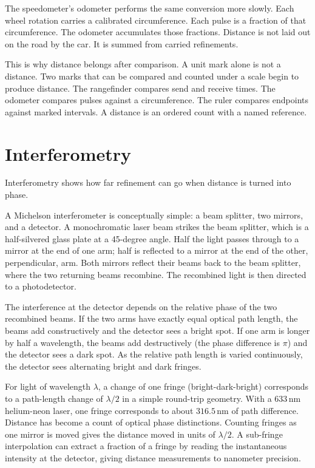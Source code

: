The speedometer's odometer performs the same conversion more slowly. Each wheel
rotation carries a calibrated circumference. Each pulse is a fraction of that
circumference. The odometer accumulates those fractions. Distance is not laid
out on the road by the car. It is summed from carried refinements.

This is why distance belongs after comparison. A unit mark alone is not a
distance. Two marks that can be compared and counted under a scale begin to
produce distance. The rangefinder compares send and receive times. The odometer
compares pulses against a circumference. The ruler compares endpoints against
marked intervals. A distance is an ordered count with a named reference.

\section{Interferometry}
\label{se:interferometry}

Interferometry shows how far refinement can go when distance is turned into
phase.

A Michelson interferometer is conceptually simple: a beam splitter, two
mirrors, and a detector. A monochromatic laser beam strikes the beam
splitter, which is a half-silvered glass plate at a 45-degree angle. Half
the light passes through to a mirror at the end of one arm; half is
reflected to a mirror at the end of the other, perpendicular, arm. Both
mirrors reflect their beams back to the beam splitter, where the two
returning beams recombine. The recombined light is then directed to a
photodetector.

The interference at the detector depends on the relative phase of the two
recombined beams. If the two arms have exactly equal optical path length,
the beams add constructively and the detector sees a bright spot. If one
arm is longer by half a wavelength, the beams add destructively (the
phase difference is $\pi$) and the detector sees a dark spot. As the
relative path length is varied continuously, the detector sees alternating
bright and dark fringes.

For light of wavelength $\lambda$, a change of one fringe (bright-dark-bright)
corresponds to a path-length change of $\lambda/2$ in a simple round-trip
geometry. With a $633\,\mathrm{nm}$ helium-neon laser, one fringe
corresponds to about $316.5\,\mathrm{nm}$ of path difference. Distance has
become a count of optical phase distinctions. Counting fringes as one
mirror is moved gives the distance moved in units of $\lambda/2$. A
sub-fringe interpolation can extract a fraction of a fringe by reading
the instantaneous intensity at the detector, giving distance measurements
to nanometer precision.

